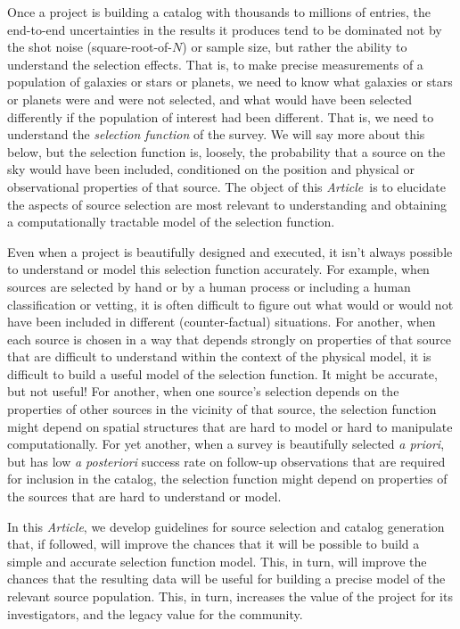 \documentclass[modern]{aastex62}
\newcommand{\documentname}{\textsl{Article}}
\newcommand{\foreign}[1]{\textsl{#1}}
\begin{document}
Once a project is building a catalog with thousands to millions of
entries, the end-to-end uncertainties in the results it produces tend
to be dominated not by the shot noise (square-root-of-$N$) or sample
size, but rather the ability to understand the selection effects.
That is, to make precise measurements of a population of galaxies or
stars or planets, we need to know what galaxies or stars or planets
were and were not selected, and what would
have been selected differently if the population of interest had been
different.
That is, we need to understand the \emph{selection function} of the
survey.
We will say more about this below, but the selection function is,
loosely, the probability that a source on the sky would have been
included, conditioned on the
position and physical or observational properties of that source.
The object of this \documentname\ is to elucidate the aspects of
source selection are most relevant to understanding and obtaining a
computationally tractable model of the selection function.

Even when a project is beautifully designed and
executed, it isn't always possible to understand or model this
selection function accurately.
For example, when sources are selected by hand or by
a human process or including a human classification or vetting, it is often difficult to
figure out what would or would not have been included in different
(counter-factual) situations.
For another, when each source is chosen in a way that depends strongly
on properties of that source that are difficult to understand within
the context of the physical model, it is difficult to build a useful
model of the selection function.
It might be accurate, but not useful!
For another, when one source's selection depends on the properties
of other sources in the vicinity of that source, the selection
function might depend on spatial structures that are hard to model or
hard to manipulate computationally.
For yet another, when a survey is beautifully selected \foreign{a priori},
but has low
\foreign{a posteriori} success rate on follow-up observations that
are required for inclusion in the catalog, the selection
function might depend on properties of the sources that are hard to
understand or model.

In this \documentname, we develop guidelines for source selection and
catalog generation
that, if followed, will improve the chances that it will be possible
to build a simple and accurate selection function model.
This, in turn, will improve the chances that the resulting data
will be useful for building a precise model of the relevant source
population.
This, in turn, increases the value of the project for its investigators,
and the legacy value for the community.
\end{document}
